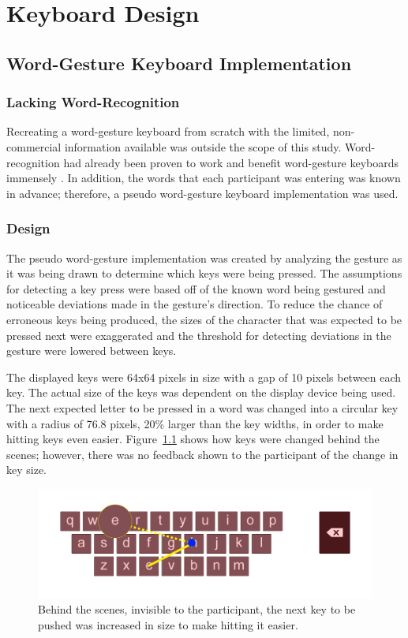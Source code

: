 \chapter{Keyboard Design} \label{keyboard_design}

\section{Word-Gesture Keyboard Implementation}
\subsection{Lacking Word-Recognition}
Recreating a word-gesture keyboard from scratch with the limited, non-commercial information available was outside the scope of this study. Word-recognition had already been proven to work and benefit word-gesture keyboards immensely \cite{ref_shape_writing,ref_the_word_gesture_keyboard,ref_shapewriter_iphone,ref_shark_wgk,ref_shorthand_writing}. In addition, the words that each participant was entering was known in advance; therefore, a pseudo word-gesture keyboard implementation was used.

\subsection{Design}
The pseudo word-gesture implementation was created by analyzing the gesture as it was being drawn to determine which keys were being pressed. The assumptions for detecting a key press were based off of the known word being gestured and noticeable deviations made in the gesture's direction. To reduce the chance of erroneous keys being produced, the sizes of the character that was expected to be pressed next were exaggerated and the threshold for detecting deviations in the gesture were lowered between keys.

The displayed keys were 64x64 pixels in size with a gap of 10 pixels between each key. The actual size of the keys was dependent on the display device being used. The next expected letter to be pressed in a word was changed into a circular key with a radius of 76.8 pixels, 20\% larger than the key widths, in order to make hitting keys even easier. Figure~\ref{key_bloating} shows how keys were changed behind the scenes; however, there was no feedback shown to the participant of the change in key size.

\begin{figure}[h]
	\centering
	\includegraphics[width=5in]{fig_bloat_key}
	\caption[Larger Key Example]{Behind the scenes, invisible to the participant, the next key to be pushed was increased in size to make hitting it easier.}
	\label{key_bloating}
\end{figure}

